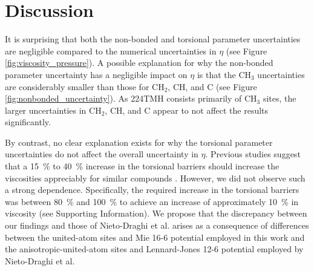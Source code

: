 \documentclass[preprint,review,12pt]{elsarticle}
\begin{document}
    \section{Discussion} \label{Discussion/Limitations}   
    
    It is surprising that both the non-bonded and torsional parameter uncertainties are negligible compared to the numerical uncertainties in $\eta$ (see Figure \ref{fig:viscosity_pressure}). A possible explanation for why the non-bonded parameter uncertainty has a negligible impact on $\eta$ is that the CH$_3$ uncertainties are considerably smaller than those for CH$_2$, CH, and C (see Figure \ref{fig:nonbonded_uncertainty}). As 224TMH consists primarily of CH$_3$ sites, the larger uncertainties in CH$_2$, CH, and C appear to not affect the results significantly. 
    
    
    By contrast, no clear explanation exists for why the torsional parameter uncertainties do not affect the overall uncertainty in $\eta$. Previous studies suggest that a 15~\% to 40~\% increase in the torsional barriers should increase the viscosities appreciably for similar compounds \cite{Nieto2006,Nieto2008}. However, we did not observe such a strong dependence. Specifically, the required increase in the torsional barriers was between 80~\% and 100~\% to achieve an increase of approximately 10~\% in viscosity (see Supporting Information). We propose that the discrepancy between our findings and those of Nieto-Draghi et al. arises as a consequence of differences between the united-atom sites and Mie 16-6 potential employed in this work and the anisotropic-united-atom sites and Lennard-Jones 12-6 potential employed by Nieto-Draghi et al.
    
    
    
    
        
\end{document}
